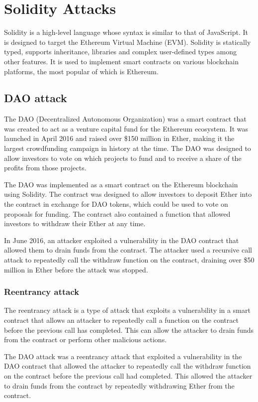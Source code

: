 \chapter{Solidity Attacks}
Solidity is a high-level language whose syntax is similar to that of JavaScript. It is designed to target the Ethereum Virtual Machine (EVM). Solidity is statically typed, supports inheritance, libraries and complex user-defined types among other features. It is used to implement smart contracts on various blockchain platforms, the most popular of which is Ethereum.

\section{DAO attack}
The DAO (Decentralized Autonomous Organization) was a smart contract that was created to act as a venture capital fund for the Ethereum ecosystem. It was launched in April 2016 and raised over \$150 million in Ether, making it the largest crowdfunding campaign in history at the time. The DAO was designed to allow investors to vote on which projects to fund and to receive a share of the profits from those projects.

The DAO was implemented as a smart contract on the Ethereum blockchain using Solidity. The contract was designed to allow investors to deposit Ether into the contract in exchange for DAO tokens, which could be used to vote on proposals for funding. The contract also contained a function that allowed investors to withdraw their Ether at any time.

In June 2016, an attacker exploited a vulnerability in the DAO contract that allowed them to drain funds from the contract. The attacker used a recursive call attack to repeatedly call the withdraw function on the contract, draining over \$50 million in Ether before the attack was stopped.

\subsection{Reentrancy attack}
The reentrancy attack is a type of attack that exploits a vulnerability in a smart contract that allows an attacker to repeatedly call a function on the contract before the previous call has completed. This can allow the attacker to drain funds from the contract or perform other malicious actions.

The DAO attack was a reentrancy attack that exploited a vulnerability in the DAO contract that allowed the attacker to repeatedly call the withdraw function on the contract before the previous call had completed. This allowed the attacker to drain funds from the contract by repeatedly withdrawing Ether from the contract.

